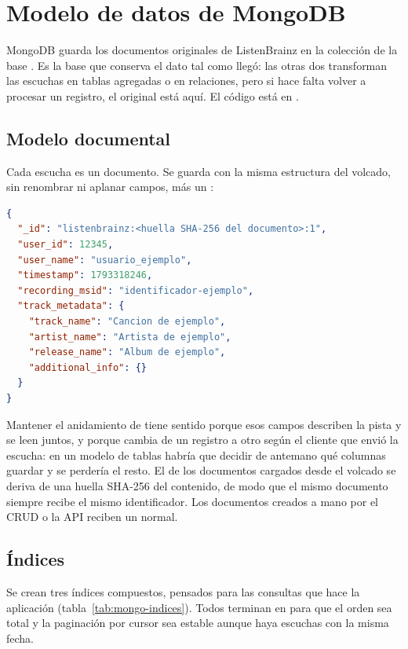 \section{Modelo de datos de MongoDB}
\label{cap:mongodb}

MongoDB guarda los documentos originales de ListenBrainz en la colección  de la base . Es la base que conserva el dato tal como llegó: las otras dos transforman las escuchas en tablas agregadas o en relaciones, pero si hace falta volver a procesar un registro, el original está aquí. El código está en .

\subsection{Modelo documental}

Cada escucha es un documento. Se guarda con la misma estructura del volcado, sin renombrar ni aplanar campos, más un :

\begin{lstlisting}[language=JSON]
{
  "_id": "listenbrainz:<huella SHA-256 del documento>:1",
  "user_id": 12345,
  "user_name": "usuario_ejemplo",
  "timestamp": 1793318246,
  "recording_msid": "identificador-ejemplo",
  "track_metadata": {
    "track_name": "Cancion de ejemplo",
    "artist_name": "Artista de ejemplo",
    "release_name": "Album de ejemplo",
    "additional_info": {}
  }
}
\end{lstlisting}

Mantener el anidamiento de  tiene sentido porque esos campos describen la pista y se leen juntos, y porque  cambia de un registro a otro según el cliente que envió la escucha: en un modelo de tablas habría que decidir de antemano qué columnas guardar y se perdería el resto. El  de los documentos cargados desde el volcado se deriva de una huella SHA-256 del contenido, de modo que el mismo documento siempre recibe el mismo identificador. Los documentos creados a mano por el CRUD o la API reciben un  normal.

\subsection{Índices}

Se crean tres índices compuestos, pensados para las consultas que hace la aplicación (tabla~\ref{tab:mongo-indices}). Todos terminan en  para que el orden sea total y la paginación por cursor sea estable aunque haya escuchas con la misma fecha.

